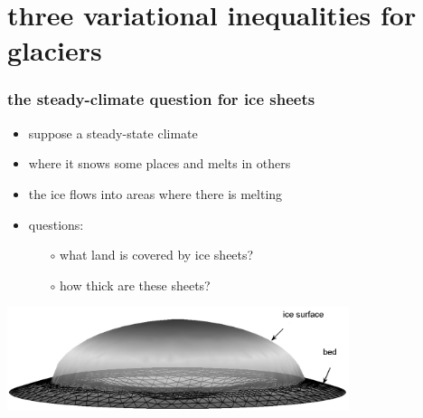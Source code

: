 \documentclass{beamer}
\begin{document}
\section[glaciers]{three variational inequalities for glaciers}


\begin{frame}
  \frametitle{the steady-climate question for ice sheets}

\begin{itemize}
\item suppose a steady-state climate
\item where it snows some places and melts in others
\item the ice flows into areas where there is melting
\item questions:
  \begin{itemize}
  \item[$\circ$]  what land is covered by ice sheets?
  \item[$\circ$]  how thick are these sheets?
  \end{itemize}
\end{itemize}
\begin{center}
\includegraphics[width=0.75\textwidth]{capnonflatobs}
\end{center}
\end{frame}
\end{document}
